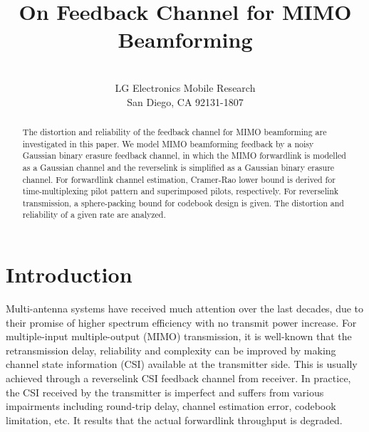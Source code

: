 \documentclass[10pt,fleqn, twocolumn]{IEEEtran}
\title{On Feedback Channel for MIMO Beamforming}
\author{\\LG Electronics Mobile Research\\San Diego, CA 92131-1807}
\date{}
\begin{document}
\maketitle
\begin{abstract}\small
The distortion and reliability of the feedback channel for MIMO
beamforming are investigated in this paper. We model MIMO
beamforming feedback by a noisy Gaussian binary erasure feedback
channel, in which the MIMO forwardlink is modelled as a Gaussian
channel and the reverselink is simplified as a Gaussian binary
erasure channel. For forwardlink channel estimation, Cramer-Rao
lower bound is derived for time-multiplexing pilot pattern and
superimposed pilots, respectively. For reverselink transmission, a
sphere-packing bound for codebook design is given. The distortion
and reliability of a given rate are analyzed.

\end{abstract}
\section{Introduction}
Multi-antenna systems have received much attention over the last
decades, due to their promise of higher spectrum efficiency with
no transmit power increase. For multiple-input multiple-output
(MIMO) transmission, it is well-known that the retransmission
delay, reliability and complexity can be improved by making
channel state information (CSI) available at the transmitter side.
This is usually achieved through a reverselink CSI feedback
channel from receiver. In practice, the CSI received by the
transmitter is imperfect and suffers from various impairments
including round-trip delay, channel estimation error, codebook
limitation, etc. It results that the actual forwardlink throughput
is degraded.
\end{document}
